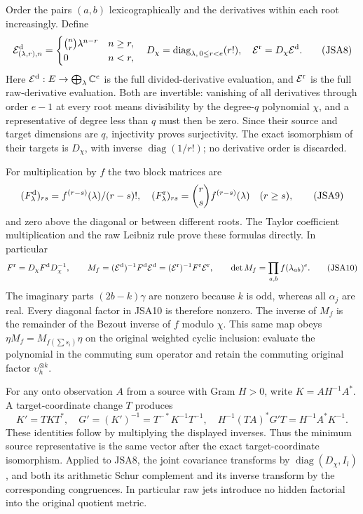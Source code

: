 \documentclass[11pt,a4paper]{article}
\newcommand{\C}{\mathbb C}
\newcommand{\diag}{\operatorname{diag}}
\begin{document}
Order the pairs $(a,b)$ lexicographically and the derivatives within
each root increasingly. Define
\[
 \mathcal E^{\rm d}_{(\lambda,r),n}
    =\begin{cases}\binom nr\lambda^{n-r}&n\geq r,\\0&n<r,
      \end{cases}
 \quad
 D_\chi=\diag_{\lambda,\,0\leq r<e}(r!),
 \quad\mathcal E^{\rm r}=D_\chi\mathcal E^{\rm d}.
\tag{JSA8}
\]
Here $\mathcal E^{\rm d}:E\to\bigoplus_\lambda\C^e$ is the
full divided-derivative evaluation, and $\mathcal E^{\rm r}$
is the full raw-derivative evaluation. Both are invertible:
vanishing of all derivatives through order $e-1$ at every root
means divisibility by the degree-$q$ polynomial $\chi$, and a
representative of degree less than $q$ must then be zero.
Since their source and target dimensions are $q$, injectivity
proves surjectivity. The exact isomorphism of their targets is
$D_\chi$, with inverse $\diag(1/r!)$; no derivative order is
discarded.

For multiplication by $f$ the two block matrices are
\[
 (F^{\rm d}_\lambda)_{rs}=f^{(r-s)}(\lambda)/(r-s)!,
 \quad
 (F^{\rm r}_\lambda)_{rs}=\binom rs f^{(r-s)}(\lambda)
 \quad(r\geq s),
\tag{JSA9}
\]
and zero above the diagonal or between different roots. The
Taylor coefficient multiplication and the raw Leibniz rule
prove these formulas directly. In particular
\[
 F^{\rm r}=D_\chi F^{\rm d}D_\chi^{-1},\qquad
 M_f=(\mathcal E^{\rm d})^{-1}F^{\rm d}\mathcal E^{\rm d}
    =(\mathcal E^{\rm r})^{-1}F^{\rm r}\mathcal E^{\rm r},
 \qquad \det M_f=\prod_{a,b}f(\lambda_{ab})^e.
\tag{JSA10}
\]
The imaginary parts $(2b-k)\gamma$ are nonzero because $k$ is
odd, whereas all $\alpha_j$ are real. Every diagonal factor in
JSA10 is therefore nonzero. The inverse of $M_f$ is the remainder
of the Bezout inverse of $f$ modulo $\chi$. This same map obeys
$\eta M_f=M_{f(\sum s_i)}\eta$ on the original weighted cyclic
inclusion: evaluate the polynomial in the commuting sum operator
and retain the commuting original factor $\upsilon_h^{\otimes k}$.

For any onto observation $A$ from a source with Gram $H>0$, write
$K=AH^{-1}A^*$. A target-coordinate change $T$ produces
\[
 K'=TKT^*,\quad G'=(K')^{-1}=T^{-*}K^{-1}T^{-1},\quad
 H^{-1}(TA)^*G'T=H^{-1}A^*K^{-1}.
\tag{JSA11}
\]
These identities follow by multiplying the displayed inverses.
Thus the minimum source representative is the same vector after
the exact target-coordinate isomorphism. Applied to JSA8, the
joint covariance transforms by $\diag(D_\chi,I_l)$, and both
its arithmetic Schur complement and its inverse transform by
the corresponding congruences. In particular raw jets introduce
no hidden factorial into the original quotient metric.
\end{document}
